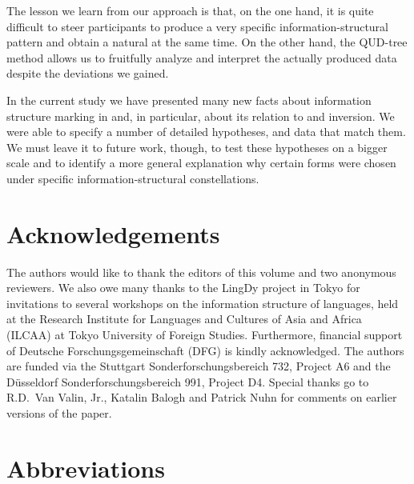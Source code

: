 \documentclass[output=paper,
,modfonts
,nonflat]{langsci/langscibook}
\begin{document}
The lesson we learn from our approach is that, on the one hand, it is quite difficult to steer participants to produce a very specific information-structural pattern and obtain a natural  at the same time. On the other hand, the QUD-tree method allows us to fruitfully analyze and interpret the actually produced data despite the deviations we gained.

In the current study we have presented many new facts about information structure marking in  and, in particular, about its relation to  and inversion. We were able to specify a number of detailed hypotheses, and data that match them. We must leave it to future work, though, to test these hypotheses on a bigger scale and to identify a more general explanation why certain  forms were chosen under specific information-structural constellations.

\section*{Acknowledgements}
The authors would like to thank the editors of this volume and two anonymous reviewers. We also owe many thanks to the LingDy project in Tokyo for invitations to several workshops on the information structure of  languages, held at the Research Institute for Languages and Cultures of Asia and Africa (ILCAA) at Tokyo University of Foreign Studies. Furthermore, financial support of Deutsche Forschungsgemeinschaft (DFG) is kindly acknowledged. The authors are funded via the Stuttgart Sonderforschungsbereich 732, Project A6 and the D\"usseldorf Sonderforschungsbereich 991, Project D4. Special thanks go to R.D.\ Van Valin, Jr., Katalin Balogh and Patrick Nuhn for comments on earlier versions of the paper.

 
\section*{Abbreviations}
\end{document}

